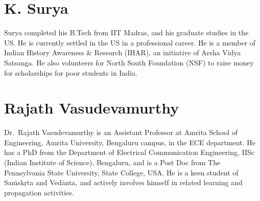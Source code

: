 \section*{K. Surya}

Surya completed his B.Tech from IIT Madras, and his graduate studies in the US. He is currently settled in the US in a professional career. He is a member of Indian History Awareness \& Research (IHAR), an initiative of Arsha Vidya Satsanga. He also volunteers for North South Foundation (NSF) to raise money for scholarships for poor students in India. 

\section*{Rajath Vasudevamurthy}

Dr.~Rajath Vasudevamurthy is an Assistant Professor at Amrita School of Engineering, Amrita University, Bengaluru campus, in the ECE department. He has a PhD from the Department of Electrical Communication Engineering, IISc (Indian Institute of Science), Bengaluru, and is a Post Doc from The Pennsylvania State University, State College, USA. He is a keen student of Saṁskṛta and Vedānta, and actively involves himself in related learning and propagation activities.

